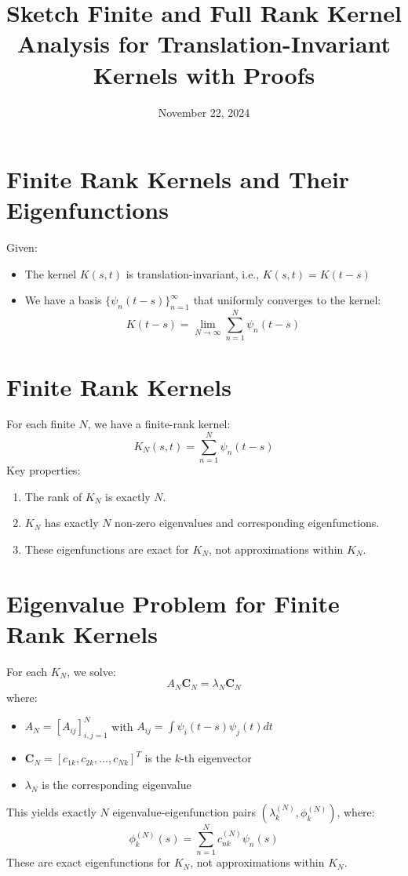 \documentclass{article}
\begin{document}
\title{Sketch Finite and Full Rank Kernel Analysis for Translation-Invariant
Kernels with Proofs}

\date{November 22, 2024}

\maketitle

\section{Finite Rank Kernels and Their Eigenfunctions}

Given:
\begin{itemize}
  \item The kernel $K (s, t)$ is translation-invariant, i.e., $K (s, t) = K (t
  - s)$
  
  \item We have a basis $\{\psi_n (t - s)\}_{n = 1}^{\infty}$ that uniformly
  converges to the kernel:
  \[ K (t - s) = \lim_{N \to \infty}  \sum_{n = 1}^N \psi_n  (t - s) \]
\end{itemize}

\section{Finite Rank Kernels}

For each finite $N$, we have a finite-rank kernel:
\[ K_N (s, t) = \sum_{n = 1}^N \psi_n  (t - s) \]
Key properties:
\begin{enumerate}
  \item The rank of $K_N$ is exactly $N$.
  
  \item $K_N$ has exactly $N$ non-zero eigenvalues and corresponding
  eigenfunctions.
  
  \item These eigenfunctions are exact for $K_N$, not approximations within
  $K_N$.
\end{enumerate}

\section{Eigenvalue Problem for Finite Rank Kernels}

For each $K_N$, we solve:
\[ A_N \mathbf{C}_N = \lambda_N \mathbf{C}_N \]
where:
\begin{itemize}
  \item $A_N = [A_{ij}]_{i, j = 1}^N$ with $A_{ij} = \int \psi_i  (t - s)
  \psi_j (t) dt$
  
  \item $\mathbf{C}_N = [c_{1 k}, c_{2 k}, ..., c_{Nk}]^T$ is the $k$-th
  eigenvector
  
  \item $\lambda_N$ is the corresponding eigenvalue
\end{itemize}
This yields exactly $N$ eigenvalue-eigenfunction pairs $(\lambda_k^{(N)},
\phi_k^{(N)})$, where:
\[ \phi_k^{(N)} (s) = \sum_{n = 1}^N c_{nk}^{(N)} \psi_n (s) \]
These are exact eigenfunctions for $K_N$, not approximations within $K_N$.
\end{document}
